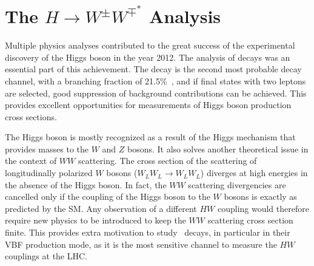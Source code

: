 \chapter{The $H\rightarrow W^{\pm}W^{\mp^*}$ Analysis}
\label{chap:hww}


Multiple physics analyses contributed to the great success of the experimental discovery of the Higgs boson in the year 2012. The analysis of \HWW decays was an essential part of this achievement. 
The \HWW decay is the second most probable decay channel, with a branching fraction of 21.5\%~\cite{PDG2020}, and if final states with two leptons are selected, good suppression of background contributions can be achieved.
This provides excellent opportunities for measurements of Higgs boson production cross sections.

The Higgs boson is mostly recognized as a result of the Higgs mechanism that provides masses to the $W$ and $Z$ bosons. 
It also solves another theoretical issue in the context of $WW$ scattering.
The cross section of the scattering of longitudinally polarized $W$ bosons ($W_LW_L \to W_LW_L$) diverges at high energies in the absence of the Higgs boson. In fact, the $WW$ scattering divergencies are cancelled only if the coupling of the Higgs boson to the $W$ bosons is exactly as predicted by the SM. Any observation of a different $HW$ coupling would therefore require new physics to be introduced to keep the $WW$ scattering cross section finite. 
This provides extra motivation to study \HWW\ decays, in particular in their VBF production mode, as it is the most sensitive channel to measure the $HW$ couplings at the LHC.

